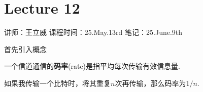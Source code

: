 \chapter{Lecture 12}

\begin{center}
    讲师：王立威 \qquad
    课程时间：25.May.13rd \qquad 
    笔记：25.June.9th
\end{center}

\bigskip

首先引入概念
\begin{definition}[码率]
    一个信道通信的\textbf{码率}(rate)是指平均每次传输有效信息量.
\end{definition}
\begin{example}
    如果我传输一个比特时，将其重复$n$次再传输，那么码率为$1/n$.
\end{example}

